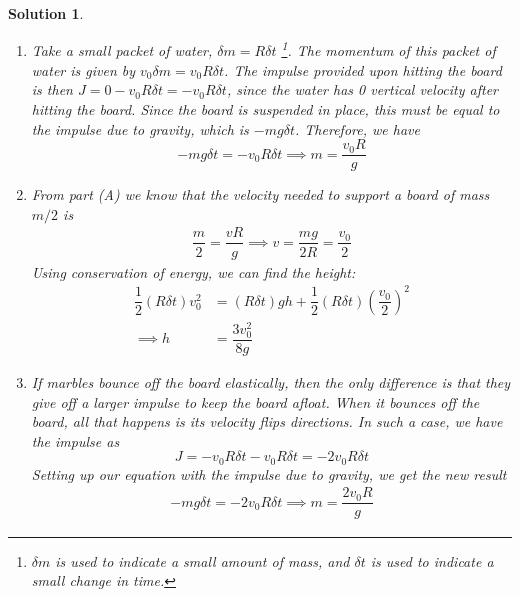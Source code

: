 \documentclass[12pt]{article}
\newtheorem*{solution}{Solution}
\theoremstyle{mystyle}
\begin{document}
\begin{solution}
    \begin{enumerate}[label=\Alph*)]
        \item Take a small packet of water, $\delta m=R\delta t$
        \footnote{$\delta m$ is used to indicate a \textit{small} amount of mass,
        and $\delta t$ is used to indicate a \textit{small} change in time.}.
        The momentum of this packet of water is given by
        $v_0\delta m=v_0R\delta t$. The impulse provided upon hitting the
        board is then $J=0-v_0R\delta t=-v_0R\delta t$, since the water has 0 vertical velocity after hitting the board.
        Since the board is suspended in place, this must be equal to the impulse due to gravity, which is
        $-mg\delta t$. Therefore, we have \[
            -mg\delta t=-v_0R\delta t\implies \boxed{m=\dfrac{v_0R}{g}}
        \]

        \item 
        From part (A) we know that the velocity needed to support a board of
        mass $m/2$ is
        \begin{align*}
            \dfrac{m}{2}=\dfrac{vR}{g}
                \implies v=\dfrac{mg}{2R}=\dfrac{v_0}{2}
        \end{align*}
        Using conservation of energy, we can find the height:
        \begin{align*}
            \dfrac{1}{2}(R\delta t)v_0^2&=(R\delta t)gh+\dfrac{1}{2}(R\delta t)\left(\dfrac{v_0}{2}\right)^2\\
            \implies h&=\dfrac{3v_0^2}{8g}
        \end{align*}

        \item 
        If marbles bounce off the board elastically, then the only
        difference is that they give off a larger impulse to keep the
        board afloat. When it bounces off the board, all that happens is
        its velocity flips directions. 
        In such a case, we have the impulse as \[
            J= -v_0R\delta t-v_0R\delta t=-2v_0R\delta t
        \]
        Setting up our equation with the impulse due to gravity, we get
        the new result
        \begin{align*}
            -mg\delta t=-2v_0R\delta t\implies\boxed{m=\dfrac{2v_0R}{g}}
        \end{align*}
    \end{enumerate}
\end{solution}
\end{document}
